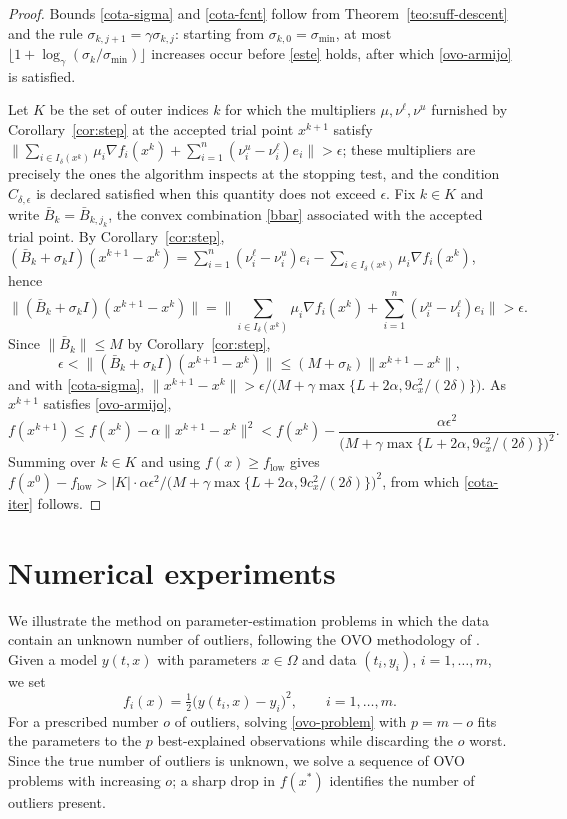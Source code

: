 \documentclass[11pt]{article}
\newcommand{\flow}{f_{\mathrm{low}}}
\newcounter{alg}[section]
\begin{document}
\begin{proof}
Bounds \eqref{cota-sigma} and \eqref{cota-fcnt} follow from
Theorem~\ref{teo:suff-descent} and the rule
$\sigma_{k,j+1} = \gamma\sigma_{k,j}$: starting from
$\sigma_{k,0} = \sigma_{\min}$, at most
$\lfloor 1 + \log_\gamma(\sigma_k/\sigma_{\min}) \rfloor$ increases occur before
\eqref{este} holds, after which \eqref{ovo-armijo} is satisfied.

Let $K$ be the set of outer indices $k$ for which the multipliers
$\mu, \nu^\ell, \nu^u$ furnished by Corollary~\ref{cor:step} at the accepted
trial point $x^{k+1}$ satisfy
$\| \sum_{i \in I_\delta(x^k)} \mu_i \nabla f_i(x^k)
+ \sum_{i=1}^n (\nu^u_i - \nu^\ell_i) e_i \| > \epsilon$; these multipliers are
precisely the ones the algorithm inspects at the stopping test, and the
condition $C_{\delta,\epsilon}$ is declared satisfied when this quantity does
not exceed $\epsilon$. Fix $k \in K$ and write
$\bar{B}_k = \bar{B}_{k,j_k}$, the convex
combination \eqref{bbar} associated with the accepted trial point. By
Corollary~\ref{cor:step},
$(\bar{B}_k + \sigma_k I)(x^{k+1} - x^k)
= \sum_{i=1}^n (\nu^\ell_i - \nu^u_i) e_i
- \sum_{i \in I_\delta(x^k)} \mu_i \nabla f_i(x^k)$, hence
\[
\big\| (\bar{B}_k + \sigma_k I)(x^{k+1} - x^k) \big\|
= \Big\| \sum_{i \in I_\delta(x^k)} \mu_i \nabla f_i(x^k)
+ \sum_{i=1}^n (\nu^u_i - \nu^\ell_i) e_i \Big\| > \epsilon .
\]
Since $\|\bar{B}_k\| \leq M$ by Corollary~\ref{cor:step},
\[
\epsilon < \| (\bar{B}_k + \sigma_k I)(x^{k+1} - x^k) \|
\leq (M + \sigma_k) \|x^{k+1} - x^k\|,
\]
and with \eqref{cota-sigma},
$\|x^{k+1} - x^k\| > \epsilon / \big( M + \gamma\max\{L + 2\alpha, 9c_x^2/(2\delta)\} \big)$.
As $x^{k+1}$ satisfies \eqref{ovo-armijo},
\[
f(x^{k+1}) \leq f(x^k) - \alpha\|x^{k+1} - x^k\|^2
< f(x^k) - \frac{\alpha\epsilon^2}
{\big( M + \gamma\max\{L + 2\alpha, 9c_x^2/(2\delta)\} \big)^2}.
\]
Summing over $k \in K$ and using $f(x) \geq \flow$ gives
$f(x^0) - \flow > |K| \cdot \alpha\epsilon^2 /
\big( M + \gamma\max\{L + 2\alpha, 9c_x^2/(2\delta)\} \big)^2$, from which
\eqref{cota-iter} follows.
\end{proof}

\section{Numerical experiments} \label{sec:numerical}

We illustrate the method on parameter-estimation problems in which the data
contain an unknown number of outliers, following the OVO methodology of
\cite{alvarezovo}. Given a model $y(t,x)$ with parameters $x\in\Omega$ and data
$(t_i,y_i)$, $i=1,\dots,m$, we set
\[
f_i(x)=\tfrac12\big(y(t_i,x)-y_i\big)^2,\qquad i=1,\dots,m.
\]
For a prescribed number $o$ of outliers, solving \eqref{ovo-problem} with
$p=m-o$ fits the parameters to the $p$ best-explained observations while
discarding the $o$ worst. Since the true number of outliers is unknown, we
solve a sequence of OVO problems with increasing $o$; a sharp drop in $f(x^*)$
identifies the number of outliers present.
\end{document}

